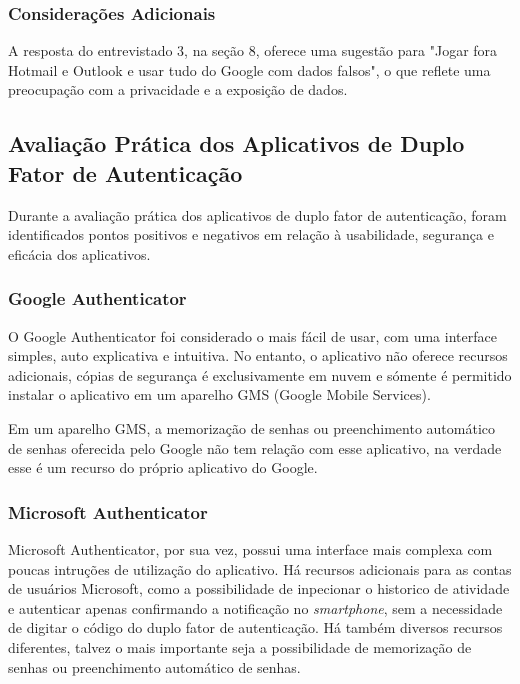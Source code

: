 \documentclass[12pt]{article}
\begin{document}
\subsubsection{Considerações Adicionais}

A resposta do entrevistado 3, na seção 8, oferece uma sugestão para "Jogar fora Hotmail
e Outlook e usar tudo do Google com dados falsos", o que reflete uma preocupação com a
privacidade e a exposição de dados.

\subsection{Avaliação Prática dos Aplicativos de Duplo Fator de Autenticação}

Durante a avaliação prática dos aplicativos de duplo fator de autenticação,
foram identificados pontos positivos e negativos em relação à usabilidade,
segurança e eficácia dos aplicativos.

\subsubsection{Google Authenticator}

O Google Authenticator foi considerado o mais fácil de usar, com uma
interface simples, auto explicativa e intuitiva.
No entanto, o aplicativo não oferece recursos adicionais, cópias de segurança
é exclusivamente em nuvem e sómente é permitido instalar o aplicativo em um
aparelho GMS (Google Mobile Services).

Em um aparelho GMS, a memorização de senhas ou preenchimento automático de
senhas oferecida pelo Google não tem relação com esse aplicativo, na verdade
esse é um recurso do próprio aplicativo do Google.

\subsubsection{Microsoft Authenticator}\label{sec:figs}

Microsoft Authenticator, por sua vez, possui uma interface mais complexa com
poucas intruções de utilização do aplicativo.
Há recursos adicionais para as contas de usuários Microsoft, como a possibilidade de
inpecionar o historico de atividade e autenticar apenas confirmando a notificação
no \textit{smartphone}, sem a necessidade de digitar o código do duplo fator de autenticação.
Há também diversos recursos diferentes, talvez o mais importante seja a possibilidade
de memorização de senhas ou preenchimento automático de senhas.
\end{document}
